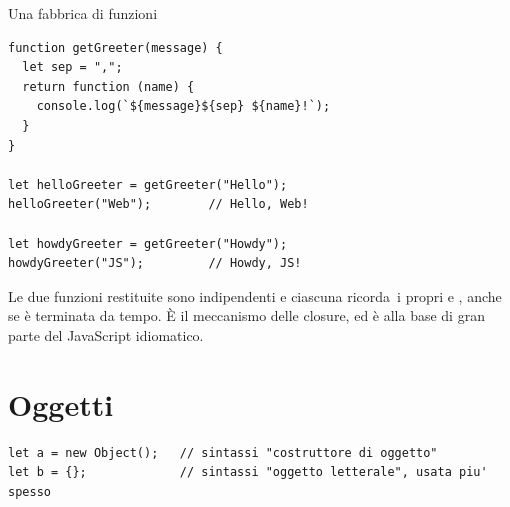 \begin{esempio}{Una fabbrica di funzioni}
\begin{affianco}[0.45][c]
\begin{lstlisting}[style=js, name=fabbrica.js]
function getGreeter(message) {
  let sep = ",";
  return function (name) {
    console.log(`${message}${sep} ${name}!`);
  }
}

let helloGreeter = getGreeter("Hello");
helloGreeter("Web");        // Hello, Web!

let howdyGreeter = getGreeter("Howdy");
howdyGreeter("JS");         // Howdy, JS!
\end{lstlisting}
\risultato
\begin{immagine}
\end{immagine}
\end{affianco}

Le due funzioni restituite sono indipendenti e ciascuna \guillemotleft ricorda\guillemotright\ i
propri  e , anche se  è terminata da
tempo. È il meccanismo delle closure, ed è alla base di gran parte del
JavaScript idiomatico.
\end{esempio}

\section{Oggetti}


\begin{lstlisting}[style=js, name=oggetti.js]
let a = new Object();   // sintassi "costruttore di oggetto"
let b = {};             // sintassi "oggetto letterale", usata piu' spesso
\end{lstlisting}

